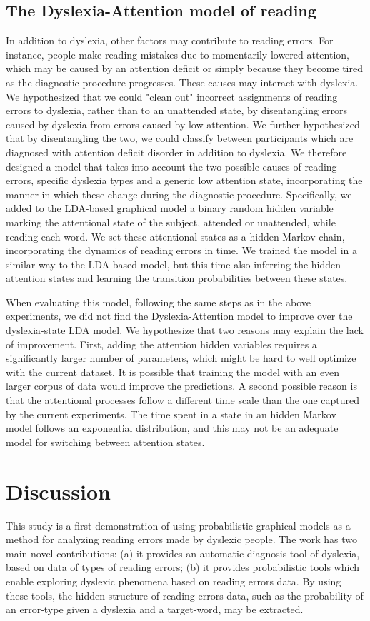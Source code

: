 {{\subsection{The Dyslexia-Attention model of reading}
In addition to dyslexia, other factors may contribute to reading errors. For instance, people make reading mistakes due to momentarily lowered attention, which may be caused by an attention deficit or simply because they become tired as the diagnostic procedure progresses. These causes may interact with dyslexia. We hypothesized that we could "clean out" incorrect assignments of reading errors to dyslexia, rath\-er than to an unattended state, by disentangling errors caus\-ed by dyslexia from errors caused by low attention. We further hypothesized that by disentangling the two, we could classify between participants which are diagnosed with attention deficit disorder in addition to dyslexia. We therefore designed a model that takes into account the two possible causes of reading errors, specific dyslexia types and a generic low attention state, incorporating the manner in which these change during the diagnostic procedure. Specifically, we added to the LDA-based graphical model a binary random hidden variable marking the attentional state of the subject, attended or unattended, while reading each word. We set these attentional states as a hidden Markov chain, incorporating the dynamics of reading errors in time. We trained the model in a similar way to the LDA-based model, but this time also inferring the hidden attention states and learning the transition probabilities between these states.

When evaluating this model, following the same steps as in the above experiments, we did not find the Dyslexia-Attention model to improve over the dyslexia-state LDA model. We hypothesize that two reasons may explain the lack of improvement. First, adding the attention hidden variables requires a significantly larger number of parameters, which might be hard to well optimize with the current dataset. It is possible that training the model with an even larger corpus of data would improve the predictions. A second possible reason is that the attentional processes follow a different time scale than the one captured by the current experiments. The time spent in a state in an hidden Markov model follows an exponential distribution, and this may not be an adequate model for switching between attention states. 

\section{Discussion}
This study is a first demonstration of using probabilistic graphical models as a method for analyzing reading errors made by dyslexic people. The work has two main novel contributions: (a) it provides an automatic diagnosis tool of dyslexia, based on data of types of reading errors; (b) it provides probabilistic tools which enable exploring dyslexic phenomena based on reading errors data. By using these tools, the hidden structure of reading errors data, such as the probability of an error-type given a dyslexia and a target-word, may be extracted.

}}
